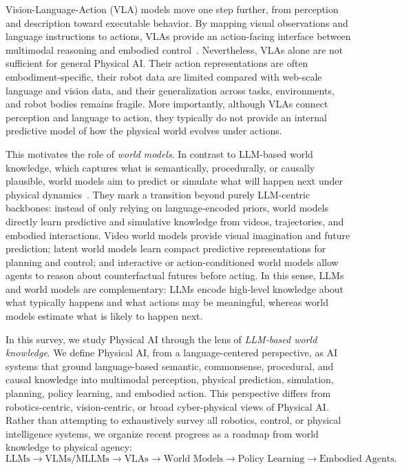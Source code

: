 Vision-Language-Action (VLA) models move one step further, from perception and description toward executable behavior. 
By mapping visual observations and language instructions to actions, VLAs provide an action-facing interface between multimodal reasoning and embodied control~\citep{driess2023palm,zitkovich2023rt,kim2024openvla,black2024pi0}. 
Nevertheless, VLAs alone are not sufficient for general Physical AI. 
Their action representations are often embodiment-specific, their robot data are limited compared with web-scale language and vision data, and their generalization across tasks, environments, and robot bodies remains fragile. 
More importantly, although VLAs connect perception and language to action, they typically do not provide an internal predictive model of how the physical world evolves under actions.

This motivates the role of \emph{world models}. 
In contrast to LLM-based world knowledge, which captures what is semantically, procedurally, or causally plausible, world models aim to predict or simulate what will happen next under physical dynamics~\citep{ha2018world,lecun2022path}. 
They mark a transition beyond purely LLM-centric backbones: instead of only relying on language-encoded priors, world models directly learn predictive and simulative knowledge from videos, trajectories, and embodied interactions. 
Video world models provide visual imagination and future prediction; latent world models learn compact predictive representations for planning and control; and interactive or action-conditioned world models allow agents to reason about counterfactual futures before acting. 
In this sense, LLMs and world models are complementary: LLMs encode high-level knowledge about what typically happens and what actions may be meaningful, whereas world models estimate what is likely to happen next.

In this survey, we study Physical AI through the lens of \emph{LLM-based world knowledge}. 
We define Physical AI, from a language-centered perspective, as AI systems that ground language-based semantic, commonsense, procedural, and causal knowledge into multimodal perception, physical prediction, simulation, planning, policy learning, and embodied action. 
This perspective differs from robotics-centric, vision-centric, or broad cyber-physical views of Physical AI. 
Rather than attempting to exhaustively survey all robotics, control, or physical intelligence systems, we organize recent progress as a roadmap from world knowledge to physical agency:
\begin{equation}
    \text{LLMs} \rightarrow \text{VLMs/MLLMs} \rightarrow \text{VLAs} \rightarrow \text{World Models} \rightarrow \text{Policy Learning} \rightarrow \text{Embodied Agents}.
\end{equation}

